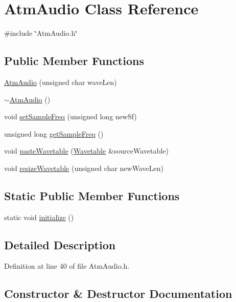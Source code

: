\hypertarget{class_atm_audio}{}\section{Atm\+Audio Class Reference}
\label{class_atm_audio}


{\ttfamily \#include \char`\"{}Atm\+Audio.\+h\char`\"{}}

\subsection*{Public Member Functions}
\begin{DoxyCompactItemize}
\item 
\hyperlink{class_atm_audio_adef4ded5a0c213fe421025e17de0605e}{Atm\+Audio} (unsigned char wave\+Len)
\item 
\hyperlink{class_atm_audio_ad4d285853a6790f23fd8dd24998a830b}{$\sim$\+Atm\+Audio} ()
\item 
void \hyperlink{class_atm_audio_ab27c4dabb9e47a386de693b47422bb2a}{set\+Sample\+Freq} (unsigned long new\+Sf)
\item 
unsigned long \hyperlink{class_atm_audio_a9336911a6a8dd22d4030b0457270c242}{get\+Sample\+Freq} ()
\item 
void \hyperlink{class_atm_audio_a3944db83a92a88144603c78b0260463a}{paste\+Wavetable} (\hyperlink{class_wavetable}{Wavetable} \&source\+Wavetable)
\item 
void \hyperlink{class_atm_audio_ab634d78d1e88550a4ed0ff1d93ed2d97}{resize\+Wavetable} (unsigned char new\+Wave\+Len)
\end{DoxyCompactItemize}
\subsection*{Static Public Member Functions}
\begin{DoxyCompactItemize}
\item 
static void \hyperlink{class_atm_audio_ada27d4d2556b8b27f4c3c8b4da763176}{initialize} ()
\end{DoxyCompactItemize}


\subsection{Detailed Description}


Definition at line 40 of file Atm\+Audio.\+h.



\subsection{Constructor \& Destructor Documentation}
\mbox{\label{class_atm_audio_adef4ded5a0c213fe421025e17de0605e}} 
